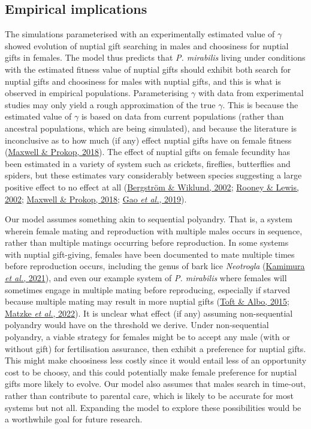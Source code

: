 \documentclass[
]{article}
\begin{document}
\hypertarget{empirical-implications}{%
\subsection{Empirical implications}\label{empirical-implications}}

The simulations parameterised with an experimentally estimated value of
\(\gamma\) showed evolution of nuptial gift searching in males and
choosiness for nuptial gifts in females. The model thus predicts that
\emph{P. mirabilis} living under conditions with the estimated fitness
value of nuptial gifts should exhibit both search for nuptial gifts and
choosiness for males with nuptial gifts, and this is what is observed in
empirical populations. Parameterising \(\gamma\) with data from
experimental studies may only yield a rough approximation of the true
\(\gamma\). This is because the estimated value of \(\gamma\) is based
on data from current populations (rather than ancestral populations,
which are being simulated), and because the literature is inconclusive
as to how much (if any) effect nuptial gifts have on female fitness
(\protect\hyperlink{ref-Maxwell2018}{Maxwell \& Prokop, 2018}). The
effect of nuptial gifts on female fecundity has been estimated in a
variety of system such as crickets, fireflies, butterflies and spiders,
but these estimates vary considerably between species suggesting a large
positive effect to no effect at all
(\protect\hyperlink{ref-Bergstrom2002}{Bergström \& Wiklund, 2002};
\protect\hyperlink{ref-Rooney2002}{Rooney \& Lewis, 2002};
\protect\hyperlink{ref-Maxwell2018}{Maxwell \& Prokop, 2018};
\protect\hyperlink{ref-Gao2019}{Gao \emph{et al.}, 2019}).

Our model assumes something akin to sequential polyandry. That is, a
system wherein female mating and reproduction with multiple males occurs
in sequence, rather than multiple matings occurring before reproduction.
In some systems with nuptial gift-giving, females have been documented
to mate multiple times before reproduction occurs, including the genus
of bark lice \emph{Neotrogla}
(\protect\hyperlink{ref-Kamimura2021}{Kamimura \emph{et al.}, 2021}),
and even our example system of \emph{P. mirabilis} where females will
sometimes engage in multiple mating before reproducing, especially if
starved because multiple mating may result in more nuptial gifts
(\protect\hyperlink{ref-Toft2015}{Toft \& Albo, 2015};
\protect\hyperlink{ref-Matzke2022}{Matzke \emph{et al.}, 2022}). It is
unclear what effect (if any) assuming non-sequential polyandry would
have on the threshold we derive. Under non-sequential polyandry, a
viable strategy for females might be to accept any male (with or without
gift) for fertilisation assurance, then exhibit a preference for nuptial
gifts. This might make choosiness less costly since it would entail less
of an opportunity cost to be choosy, and this could potentially make
female preference for nuptial gifts more likely to evolve. Our model
also assumes that males search in time-out, rather than contribute to
parental care, which is likely to be accurate for most systems but not
all. Expanding the model to explore these possibilities would be a
worthwhile goal for future research.
\end{document}
